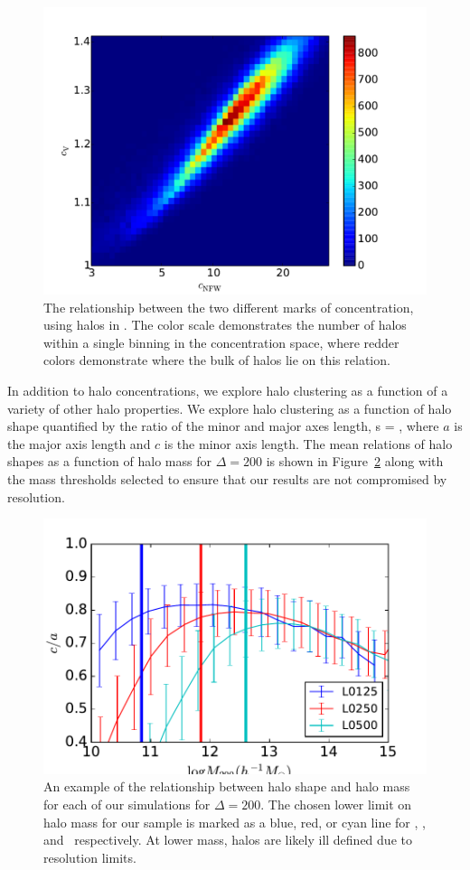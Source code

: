 \documentclass[usenatbib,usegraphicx,letterpaper]{mn2e}
\begin{document}
\begin{figure}
\centering
\includegraphics[width=.5\textwidth]{L0250_compare_cnfwvcV_z00.pdf}
\caption{
The relationship between the two different marks of concentration, using halos in \simB. The color scale demonstrates the number of halos within a single binning in the concentration space, where redder colors demonstrate where the bulk of halos lie on this relation. 
}
\label{fig:concentrations}
\end{figure}

In addition to halo concentrations, we explore halo clustering as a function of a variety of other 
halo properties. We explore halo clustering as a function of halo shape quantified by the ratio of 
the minor and major axes length, 
\beq
s = ,
\eeq
where $a$ is the major axis length and $c$ is the minor axis length. The mean relations of halo shapes 
as a function of halo mass for $\Delta=200$ is shown in Figure~\ref{fig:srelation} along with the mass 
thresholds selected to ensure that our results are not compromised by resolution.


\begin{figure}
\centering
\includegraphics[width=.5\textwidth]{masscut_shape_d200.pdf}
\caption{
An example of the relationship between halo shape and 
halo mass for each of our simulations for $\Delta =200$. The chosen 
lower limit on halo mass for our sample is marked as a blue, red, or 
cyan line for \simA, \simB, and \simC \ respectively. At lower mass, 
halos are likely ill defined due to resolution limits.
}
\label{fig:srelation}
\end{figure}
\end{document}
